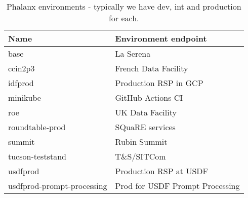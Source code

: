 \begin{longtable}{l|l}
\caption {Phalanx environments - typically we have dev, int and production for each.}\label{tab:envs}\\
\hline
\textbf{Name} & \textbf{Environment endpoint}  \\\hline
base & La Serena \\\hline
ccin2p3 & French Data Facility \\\hline
idfprod & Production RSP in GCP \\\hline
minikube & GitHub Actions CI \\\hline
roe & UK Data Facility \\\hline
roundtable-prod & SQuaRE services \\\hline
summit & Rubin Summit \\\hline
tucson-teststand & T\&S/SITCom \\\hline
usdfprod &  Production RSP at USDF \\\hline
usdfprod-prompt-processing & Prod for USDF Prompt Processing \\\hline
\end{longtable}
